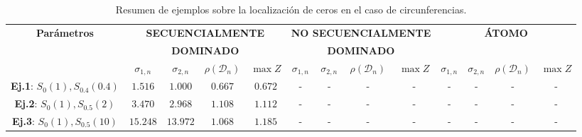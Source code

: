 \begin{table}
	\centering
	\footnotesize
	\caption{Resumen de ejemplos sobre la localización de ceros en el caso de circunferencias.}
	\begin{tabular}{|c|cccc|cccc|cccc|}
		\hline
		\multirow{3}{*}{\textbf{Parámetros}}     & \multicolumn{4}{c|}{\textbf{SECUENCIALMENTE}} & \multicolumn{4}{c|}{\textbf{NO SECUENCIALMENTE}} & \multicolumn{4}{c|}{\textbf{ÁTOMO}}                                                                                                                                                                            \\
		                                         & \multicolumn{4}{c|}{\textbf{DOMINADO}}        & \multicolumn{4}{c|}{\textbf{DOMINADO}}           & \multicolumn{4}{c|}{}                                                                                                                                                                                          \\
		\cline{2-13}
		                                         & $\sigma_{1,n}$                                & $\sigma_{2,n}$                                   & $\rho(\mathcal{D}_{n})$             & $\max Z$ & $\sigma_{1,n}$         & $\sigma_{2,n}$ & $\rho(\mathcal{D}_{n})$ & $\max Z$ & $\sigma_{1,n}$         & $\sigma_{2,n}$ & $\rho(\mathcal{D}_{n})$ & $\max Z$   \\
		\hline
		\textbf{Ej.1}: $S_{0}(1), S_{0.4}(0.4)$  & $1.516$                                       & $1.000$                                          & $0.667$                             & $0.672$  & -                      & -              & -                       & -        & -                      & -              & -                       & -          \\
		\textbf{Ej.2}: $S_{0}(1), S_{0.5}(2)$    & $3.470$                                       & $2.968$                                          & $1.108$                             & $1.112$  & -                      & -              & -                       & -        & -                      & -              & -                       & -          \\
		\textbf{Ej.3}: $S_{0}(1), S_{0.5}(10)$   & $15.248$                                      & $13.972$                                         & $1.068$                             & $1.185$  & -                      & -              & -                       & -        & -                      & -              & -                       & -          \\

\end{tabular}
\end{table}
